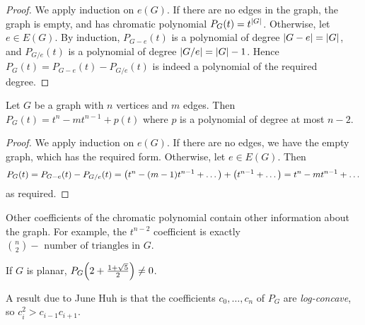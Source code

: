\begin{proof}
	We apply induction on \( e(G) \).
	If there are no edges in the graph, the graph is empty, and has chromatic polynomial \( P_G(t) = t^{\abs{G}} \).
	Otherwise, let \( e \in E(G) \).
	By induction, \( P_{G - e}(t) \) is a polynomial of degree \( \abs{G - e} = \abs{G} \), and \( P_{G / e}(t) \) is a polynomial of degree \( \abs{G / e} = \abs{G} - 1 \).
	Hence \( P_G(t) = P_{G - e}(t) - P_{G / e}(t) \) is indeed a polynomial of the required degree.
\end{proof}
\begin{proposition}
	Let \( G \) be a graph with \( n \) vertices and \( m \) edges.
	Then \( P_G(t) = t^n - mt^{n-1} + p(t) \) where \( p \) is a polynomial of degree at most \( n - 2 \).
\end{proposition}
\begin{proof}
	We apply induction on \( e(G) \).
	If there are no edges, we have the empty graph, which has the required form.
	Otherwise, let \( e \in E(G) \).
	Then
	\[ P_G(t) = P_{G - e}(t) - P_{G/e}(t) = \qty(t^n - (m - 1)t^{n-1} + \dots) + \qty(t^{n-1} + \dots) = t^n - mt^{n-1} + \dots \]
	as required.
\end{proof}
\begin{remark}
	Other coefficients of the chromatic polynomial contain other information about the graph.
	For example, the \( t^{n-2} \) coefficient is exactly \( \binom n 2 - \text{ number of triangles in } G \).

	If \( G \) is planar, \( P_G\qty(2+\frac{1+\sqrt{5}}{2}) \neq 0 \).

	A result due to June Huh is that the coefficients \( c_0, \dots, c_n \) of \( P_G \) are \emph{log-concave}, so \( c_i^2 > c_{i-1}c_{i+1} \).
\end{remark}


